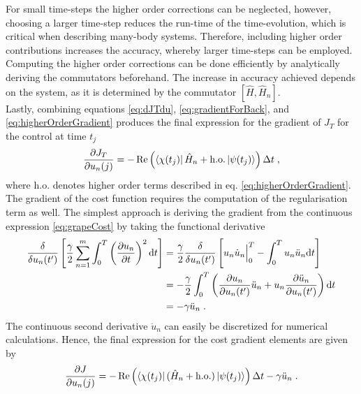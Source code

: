 For small time-steps the higher order corrections can be neglected, however, choosing a larger time-step reduces the run-time of the time-evolution, which is critical when describing many-body systems. Therefore, including higher order contributions increases the accuracy, whereby larger time-steps can be employed. Computing the higher order corrections can be done efficiently by analytically deriving the commutators beforehand. The increase in accuracy achieved depends on the system, as it is determined by the commutator $\left[ \hat{H} , \hat{H}_n  \right]$.\\
Lastly, combining equations \eqref{eq:dJTdu}, \eqref{eq:gradientForBack}, and \eqref{eq:higherOrderGradient} produces the final expression for the gradient of $J_T$ for the control at time $t_j$ 
\begin{equation}
		\frac{\partial J_T}{\partial u_n (j)}  = - \Re \left( \bra{\chi (t_j)} \hat{H}_n + \mathrm{h.o.}  \ket{\psi (t_{j})} \right)  \Delta t \; ,
\end{equation}
where $\mathrm{h.o.}$ denotes higher order terms described in eq. \eqref{eq:higherOrderGradient}.\\

The gradient of the cost function requires the computation of the regularisation term as well. The simplest approach is deriving the gradient from the continuous expression \eqref{eq:grapeCost} by taking the functional derivative
\begin{align}
	\frac{\delta }{\delta u_n (t')} \left[ \frac{\gamma}{2} \sum_{n=1}^{m} \int_{0}^{T} \left( \pdv{u_n}{t} \right)^2 \mathrm{d}t \right]
	&= \frac{\gamma}{2} \frac{\delta }{\delta u_n (t')} \left[ u_n \dot{u}_n \Big|_0^T - \int_0^T u_n \ddot{u}_n \mathrm{d}t \right] \nonumber \\
	&=  - \frac{\gamma}{2} \int_0^T \left( \pdv{u_n}{u_n (t')} \ddot{u}_n + u_n \pdv{\ddot{u}_n}{u_n (t')} \right) \mathrm{d}t  \nonumber \\
	&=  - \gamma \ddot{u}_n \; . \label{eq:regularisationGradient} 
\end{align} 
The continuous second derivative $\ddot{u}_n$ can easily be discretized for numerical calculations. Hence, the final expression for the cost gradient elements are given by
\begin{equation}
	\frac{\partial J}{\partial u_n (j)}  = - \Re \left( \bra{\chi (t_j)} ( \hat{H}_n + \mathrm{h.o.} )  \ket{\psi (t_{j})} \right)  \Delta t - \gamma \ddot{u}_n \; .
	\label{eq:costGradient}
\end{equation}\\


